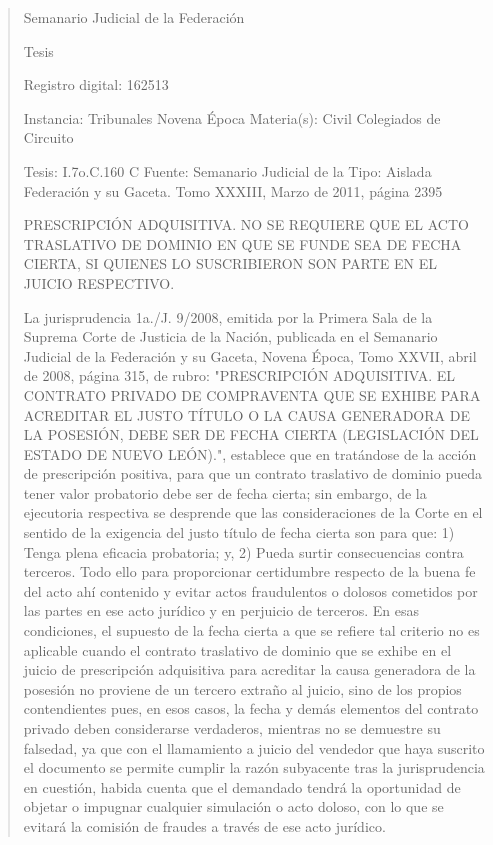 \documentclass[11pt,a4paper]{article}
\begin{document}
\begin{quote}
                                                   Semanario Judicial de la Federación

                                                  Tesis

 Registro digital: 162513

 Instancia: Tribunales             Novena Época                           Materia(s): Civil
 Colegiados de Circuito

 Tesis: I.7o.C.160 C               Fuente: Semanario Judicial de la       Tipo: Aislada
                                   Federación y su Gaceta.
                                   Tomo XXXIII, Marzo de 2011,
                                   página 2395


PRESCRIPCIÓN ADQUISITIVA. NO SE REQUIERE QUE EL ACTO TRASLATIVO DE DOMINIO
EN QUE SE FUNDE SEA DE FECHA CIERTA, SI QUIENES LO SUSCRIBIERON SON PARTE EN
EL JUICIO RESPECTIVO.


La jurisprudencia 1a./J. 9/2008, emitida por la Primera Sala de la Suprema Corte de Justicia de la
Nación, publicada en el Semanario Judicial de la Federación y su Gaceta, Novena Época, Tomo
XXVII, abril de 2008, página 315, de rubro: "PRESCRIPCIÓN ADQUISITIVA. EL CONTRATO
PRIVADO DE COMPRAVENTA QUE SE EXHIBE PARA ACREDITAR EL JUSTO TÍTULO O LA
CAUSA GENERADORA DE LA POSESIÓN, DEBE SER DE FECHA CIERTA (LEGISLACIÓN DEL
ESTADO DE NUEVO LEÓN).", establece que en tratándose de la acción de prescripción positiva,
para que un contrato traslativo de dominio pueda tener valor probatorio debe ser de fecha cierta; sin
embargo, de la ejecutoria respectiva se desprende que las consideraciones de la Corte en el sentido
de la exigencia del justo título de fecha cierta son para que: 1) Tenga plena eficacia probatoria; y, 2)
Pueda surtir consecuencias contra terceros. Todo ello para proporcionar certidumbre respecto de la
buena fe del acto ahí contenido y evitar actos fraudulentos o dolosos cometidos por las partes en
ese acto jurídico y en perjuicio de terceros. En esas condiciones, el supuesto de la fecha cierta a
que se refiere tal criterio no es aplicable cuando el contrato traslativo de dominio que se exhibe en el
juicio de prescripción adquisitiva para acreditar la causa generadora de la posesión no proviene de
un tercero extraño al juicio, sino de los propios contendientes pues, en esos casos, la fecha y
demás elementos del contrato privado deben considerarse verdaderos, mientras no se demuestre
su falsedad, ya que con el llamamiento a juicio del vendedor que haya suscrito el documento se
permite cumplir la razón subyacente tras la jurisprudencia en cuestión, habida cuenta que el
demandado tendrá la oportunidad de objetar o impugnar cualquier simulación o acto doloso, con lo
que se evitará la comisión de fraudes a través de ese acto jurídico.


\end{quote}
\end{document}
